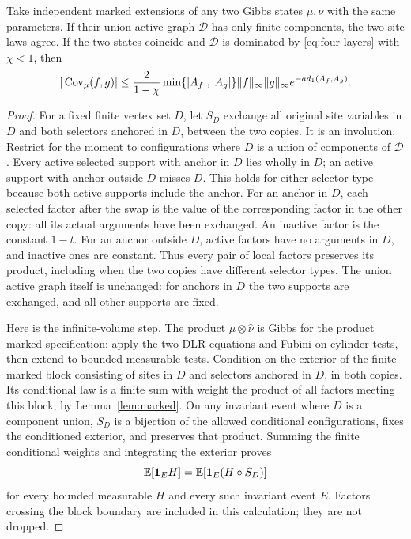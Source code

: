 \begin{lemma}\label{lem:swap}
Take independent marked extensions of any two Gibbs states $\mu,\nu$ with the same parameters. If their union active graph $\mathcal D$ has only finite components, the two site laws agree. If the two states coincide and $\mathcal D$ is dominated by \eqref{eq:four-layers} with $\chi<1$, then
\begin{equation}\label{eq:swap-bound}
 |\operatorname{Cov}_\mu(f,g)|\le\frac2{1-\chi}
 \min\{|A_f|,|A_g|\}\|f\|_\infty\|g\|_\infty
 e^{-a d_1(A_f,A_g)}.
\end{equation}
\end{lemma}
\begin{proof}
For a fixed finite vertex set $D$, let $S_D$ exchange all original site variables in $D$ and both selectors anchored in $D$, between the two copies. It is an involution. Restrict for the moment to configurations where $D$ is a union of components of $\mathcal D$. Every active selected support with anchor in $D$ lies wholly in $D$; an active support with anchor outside $D$ misses $D$. This holds for either selector type because both active supports include the anchor. For an anchor in $D$, each selected factor after the swap is the value of the corresponding factor in the other copy: all its actual arguments have been exchanged. An inactive factor is the constant $1-t$. For an anchor outside $D$, active factors have no arguments in $D$, and inactive ones are constant. Thus every pair of local factors preserves its product, including when the two copies have different selector types. The union active graph itself is unchanged: for anchors in $D$ the two supports are exchanged, and all other supports are fixed.

Here is the infinite-volume step. The product $\widehat\mu\otimes\widehat\nu$ is Gibbs for the product marked specification: apply the two DLR equations and Fubini on cylinder tests, then extend to bounded measurable tests. Condition on the exterior of the finite marked block consisting of sites in $D$ and selectors anchored in $D$, in both copies. Its conditional law is a finite sum with weight the product of all factors meeting this block, by Lemma~\ref{lem:marked}. On any invariant event where $D$ is a component union, $S_D$ is a bijection of the allowed conditional configurations, fixes the conditioned exterior, and preserves that product. Summing the finite conditional weights and integrating the exterior proves
\[
 \mathbb E[\mathbf 1_E H]=\mathbb E[\mathbf 1_E(H\circ S_D)]
\]
for every bounded measurable $H$ and every such invariant event $E$. Factors crossing the block boundary are included in this calculation; they are not dropped.


\end{proof}
